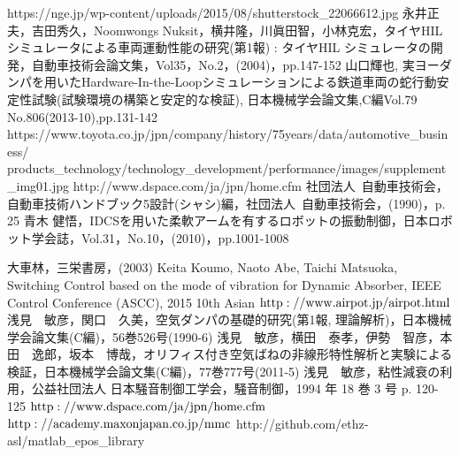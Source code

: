 \documentclass[a4paper,12pt]{article_vdlab_sotsuron}
\begin{document}
\newpage
\begin{thebibliography}{99}
https://nge.jp/wp-content/uploads/2015/08/shutterstock\_22066612.jpg
永井正夫，吉田秀久，Noomwongs Nuksit，横井隆，川眞田智，小林克宏，タイヤHIL シミュレータによる車両運動性能の研究(第1報) : タイヤHIL シミュレータの開発，自動車技術会論文集，Vol35，No.2，(2004)，pp.147-152
山口輝也, 実ヨーダンパを用いたHardware-In-the-Loopシミュレーションによる鉄道車両の蛇行動安定性試験(試験環境の構築と安定的な検証), 日本機械学会論文集,C編Vol.79 No.806(2013-10),pp.131-142
https://www.toyota.co.jp/jpn/company/history/75years/data/automotive\_business/ \\ products\_technology/technology\_development/performance/images/supplement\_img01.jpg
http://www.dspace.com/ja/jpn/home.cfm
社団法人\ 自動車技術会，自動車技術ハンドブック5設計(シャシ)編，社団法人\ 自動車技術会，(1990)，p. 25
青木 健悟，IDCSを用いた柔軟アームを有するロボットの振動制御，日本ロボット学会誌，Vol.31，No.10，(2010)，pp.1001-1008


大車林，三栄書房，(2003)
Keita Koumo, Naoto Abe, Taichi Matsuoka, Switching Control based on the mode of vibration for Dynamic Absorber, IEEE Control Conference (ASCC), 2015 10th Asian
$\rm{http://www.airpot.jp/airpot.html}$
浅見　敏彦，関口　久美，空気ダンパの基礎的研究(第1報, 理論解析)，日本機械学会論文集(C編)，56巻526号(1990-6)
浅見　敏彦，横田　泰孝，伊勢　智彦，本田　逸郎，坂本　博哉，オリフィス付き空気ばねの非線形特性解析と実験による検証，日本機械学会論文集(C編)，77巻777号(2011-5)
浅見　敏彦，粘性減衰の利用，公益社団法人 日本騒音制御工学会，騒音制御，1994 年 18 巻 3 号 p. 120-125
$\rm{http://www.dspace.com/ja/jpn/home.cfm}$
$\rm{http://academy.maxonjapan.co.jp/mmc}$
http://github.com/ethz-asl/matlab\_epos\_library
\end{thebibliography}
\end{document}
